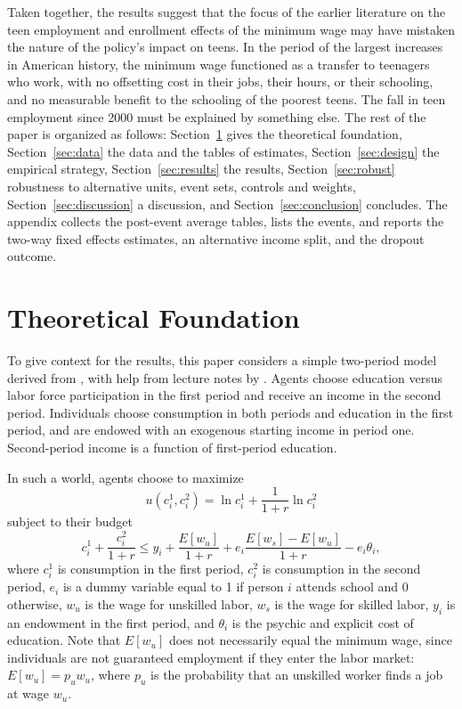 \documentclass[12pt]{article}
\begin{document}
Taken together, the results suggest that the focus of the earlier literature on the teen employment and enrollment effects of the minimum wage may have mistaken the nature of the policy's impact on teens. In the period of the largest increases in American history, the minimum wage functioned as a transfer to teenagers who work, with no offsetting cost in their jobs, their hours, or their schooling, and no measurable benefit to the schooling of the poorest teens. The fall in teen employment since 2000 must be explained by something else. The rest of the paper is organized as follows: Section~\ref{sec:theory} gives the theoretical foundation, Section~\ref{sec:data} the data and the tables of estimates, Section~\ref{sec:design} the empirical strategy, Section~\ref{sec:results} the results, Section~\ref{sec:robust} robustness to alternative units, event sets, controls and weights, Section~\ref{sec:discussion} a discussion, and Section~\ref{sec:conclusion} concludes. The appendix collects the post-event average tables, lists the events, and reports the two-way fixed effects estimates, an alternative income split, and the dropout outcome.

\section{Theoretical Foundation}\label{sec:theory}

To give context for the results, this paper considers a simple two-period model derived from \citet{mincer1976}, with help from lecture notes by \citet{acemoglu_notes}. Agents choose education versus labor force participation in the first period and receive an income in the second period. Individuals choose consumption in both periods and education in the first period, and are endowed with an exogenous starting income in period one. Second-period income is a function of first-period education.

In such a world, agents choose to maximize
\begin{equation}
u(c^1_i, c^2_i) = \ln c^1_i + \frac{1}{1+r} \ln c^2_i
\label{eq:utility}
\end{equation}
subject to their budget
\begin{equation}
c^1_i + \frac{c^2_i}{1+r} \le y_i + \frac{E[w_u]}{1+r} + e_i \frac{E[w_s] - E[w_u]}{1+r} - e_i \theta_i ,
\label{eq:budget}
\end{equation}
where $c^1_i$ is consumption in the first period, $c^2_i$ is consumption in the second period, $e_i$ is a dummy variable equal to 1 if person $i$ attends school and 0 otherwise, $w_u$ is the wage for unskilled labor, $w_s$ is the wage for skilled labor, $y_i$ is an endowment in the first period, and $\theta_i$ is the psychic and explicit cost of education. Note that $E[w_u]$ does not necessarily equal the minimum wage, since individuals are not guaranteed employment if they enter the labor market: $E[w_u] = p_u w_u$, where $p_u$ is the probability that an unskilled worker finds a job at wage $w_u$.
\end{document}
